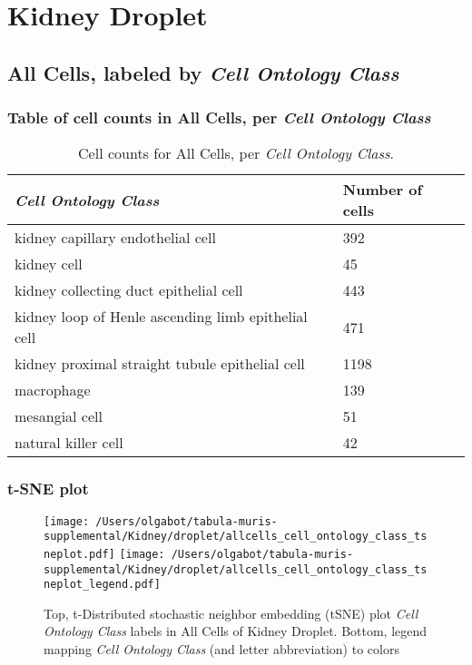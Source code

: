 \clearpage
\section{Kidney Droplet}

\subsection{All Cells, labeled by \emph{Cell Ontology Class}}
\subsubsection{Table of cell counts in All Cells, per \emph{Cell Ontology Class}}\begin{table}[h]
\centering
\label{my-label}
\begin{tabular}{@{}ll@{}}
\toprule

\emph{Cell Ontology Class}& Number of cells \\ \midrule
kidney capillary endothelial cell & 392 \\

kidney cell & 45 \\

kidney collecting duct epithelial cell & 443 \\

kidney loop of Henle ascending limb epithelial cell & 471 \\

kidney proximal straight tubule epithelial cell & 1198 \\

macrophage & 139 \\

mesangial cell & 51 \\

natural killer cell & 42 \\
\bottomrule
\end{tabular}
\caption{Cell counts for All Cells, per \emph{Cell Ontology Class}.}
\end{table}

\clearpage
\subsubsection{t-SNE plot}
\begin{figure}[h]
\centering
\texttt{[image: /Users/olgabot/tabula-muris-supplemental/Kidney/droplet/allcells\_cell\_ontology\_class\_tsneplot.pdf]}
\texttt{[image: /Users/olgabot/tabula-muris-supplemental/Kidney/droplet/allcells\_cell\_ontology\_class\_tsneplot\_legend.pdf]}
\caption{Top, t-Distributed stochastic neighbor embedding (tSNE) plot  \emph{Cell Ontology Class} labels in All Cells of Kidney Droplet. Bottom, legend mapping \emph{Cell Ontology Class} (and letter abbreviation) to colors}
\end{figure}


